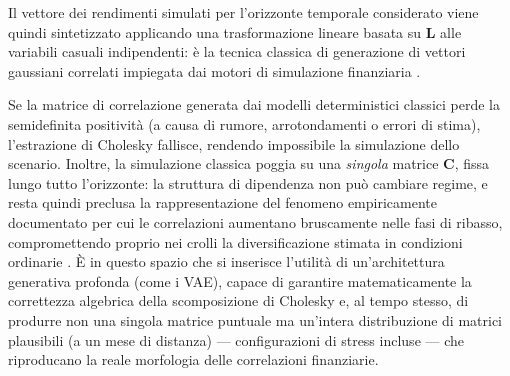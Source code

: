 Il vettore dei rendimenti simulati per l'orizzonte temporale considerato viene quindi sintetizzato applicando una trasformazione lineare basata su $\mathbf{L}$ alle variabili casuali indipendenti: è la tecnica classica di generazione di vettori gaussiani correlati impiegata dai motori di simulazione finanziaria \citep{glasserman2003montecarlo}.

Se la matrice di correlazione generata dai modelli deterministici classici perde la semidefinita positività (a causa di rumore, arrotondamenti o errori di stima), l'estrazione di Cholesky fallisce, rendendo impossibile la simulazione dello scenario. Inoltre, la simulazione classica poggia su una \emph{singola} matrice $\mathbf{C}$, fissa lungo tutto l'orizzonte: la struttura di dipendenza non può cambiare regime, e resta quindi preclusa la rappresentazione del fenomeno empiricamente documentato per cui le correlazioni aumentano bruscamente nelle fasi di ribasso, compromettendo proprio nei crolli la diversificazione stimata in condizioni ordinarie \citep{longin2001extreme, ang2002asymmetric}. È in questo spazio che si inserisce l'utilità di un'architettura generativa profonda (come i VAE), capace di garantire matematicamente la correttezza algebrica della scomposizione di Cholesky e, al tempo stesso, di produrre non una singola matrice puntuale ma un'intera distribuzione di matrici plausibili (a un mese di distanza) --- configurazioni di stress incluse --- che riproducano la reale morfologia delle correlazioni finanziarie.
